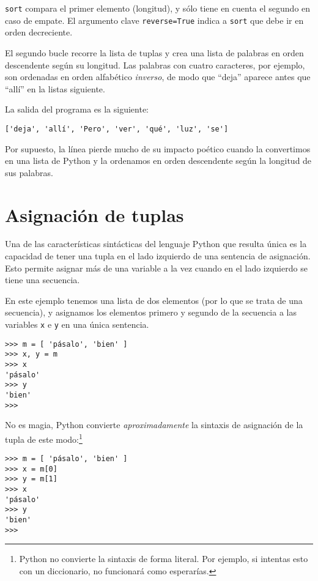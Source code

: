 {\tt sort} compara el primer elemento (longitud), y
sólo tiene en cuenta el segundo en caso de empate. El argumento
clave {\tt reverse=True} indica a {\tt sort} que debe ir en orden decreciente.


El segundo bucle recorre la lista de tuplas y crea una lista de
palabras en orden descendente según su longitud. Las palabras con cuatro caracteres,
por ejemplo, son ordenadas en orden alfabético {\em inverso}, de modo que
``deja'' aparece antes que ``allí'' en la listas siguiente.

La salida del programa es la siguiente:
%
\beforeverb
\begin{verbatim}
['deja', 'allí', 'Pero', 'ver', 'qué', 'luz', 'se']
\end{verbatim}
\afterverb
%
Por supuesto, la línea pierde mucho de su impacto poético
cuando la convertimos en una lista de Python y la ordenamos
en orden descendente según la longitud de sus palabras.

\section{Asignación de tuplas}
\label{tuple assignment}


Una de las características sintácticas del lenguaje Python que resulta única
es la capacidad de tener una tupla en el lado
izquierdo de una sentencia de asignación. Esto permite asignar
más de una variable a la vez cuando en el lado izquierdo se tiene
una secuencia.

En este ejemplo tenemos una lista de dos elementos (por lo que se trata de una secuencia), y
asignamos los elementos primero y segundo de la secuencia
a las variables {\tt x} e {\tt y} en una única sentencia.

\beforeverb
\begin{verbatim}
>>> m = [ 'pásalo', 'bien' ]
>>> x, y = m
>>> x
'pásalo'
>>> y
'bien'
>>> 
\end{verbatim}
\afterverb
%
No es magia, Python convierte \emph{aproximadamente} la
sintaxis de asignación de la tupla
de este modo:\footnote{Python no convierte la
sintaxis de forma literal. Por ejemplo, si intentas esto con un diccionario,
no funcionará como esperarías.}

\beforeverb
\begin{verbatim}
>>> m = [ 'pásalo', 'bien' ]
>>> x = m[0]
>>> y = m[1]
>>> x
'pásalo'
>>> y
'bien'
>>> 
\end{verbatim}
\afterverb

